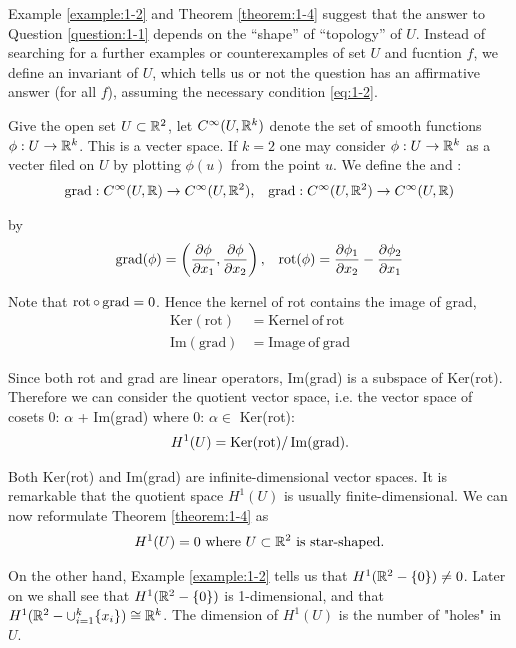 Example \ref{example:1-2} and Theorem \ref{theorem:1-4} suggest that the answer to Question \ref{question:1-1} depends on the ``shape'' of
``topology'' of $U$. Instead of searching for a further examples or counterexamples of set $U$ and fucntion $f$, we
define an invariant of $U$, which tells us or not the question has an affirmative answer (for all $f$), assuming the 
necessary condition \eqref{eq:1-2}.

Give the open set $U\subset \mathbb{R}^2$, let $C^\infty(U, \mathbb{R}^k)$ denote the set of smooth functions $\phi:U\to\mathbb{R}^k$. This 
is a vecter space. If $k=2$ one may consider $\phi:U\to\mathbb{R}^k$ as a vecter filed on $U$ by plotting $\phi(u)$ from the
point $u$. We define the  and :
\begin{align*}
  \operatorname{grad}: C^\infty(U, \mathbb{R}) \to C^\infty(U, \mathbb{R}^2), &&
  \operatorname{grad}: C^\infty(U, \mathbb{R}^2) \to C^\infty(U, \mathbb{R}) 
\end{align*}

by 
\begin{align*}
  \operatorname{grad}(\phi) = \left(\frac{\partial \phi}{\partial x_1}, \frac{\partial \phi}{\partial x_2}\right), &&
  \operatorname{rot}(\phi) = \frac{\partial \phi_1}{\partial x_2} - \frac{\partial \phi_2}{\partial x_1}
\end{align*}

Note that $\operatorname{rot}\circ \operatorname{grad} = 0$. Hence the kernel of rot contains the image of grad,
\begin{align*}
  \mathrm{Ker}(\mathrm{rot})&=\mathrm{Kernel~of~rot}\\
  \mathrm{Im}(\mathrm{grad})&=\mathrm{Image~of~grad}
\end{align*}

Since both rot and grad are linear operators, Im(grad) is a subspace of Ker(rot).
Therefore we can consider the quotient vector space, i.e. the vector space of
cosets 0: $\alpha$ + Im(grad) where 0: $\alpha\in$ Ker(rot):
\begin{align}
  H^1(U) = \operatorname{Ker}(\operatorname{rot})/\operatorname{Im}(\operatorname{grad}).
\end{align}

Both Ker(rot) and Im(grad) are infinite-dimensional vector spaces. It is remarkable 
that the quotient space $H^1(U)$ is usually finite-dimensional. We can now reformulate 
Theorem \ref{theorem:1-4} as
\begin{align}
  H^1(U) = 0 \text{ where } U\subset \mathbb{R}^2 \text{ is star-shaped}.
\end{align}

On the other hand, Example \ref{example:1-2} tells us that $H^1(\mathbb{R}^2 - \{0\})\neq 0$. Later on we shall
see that $H^1(\mathbb{R}^2 - \{0\})$ is 1-dimensional, and that $H^1(\mathbb{R}^2 - \cup_{i=1}^k\{x_i\}) \cong \mathbb{R}^k$. 
The dimension of $H^1(U)$ is the number of "holes" in $U$.

